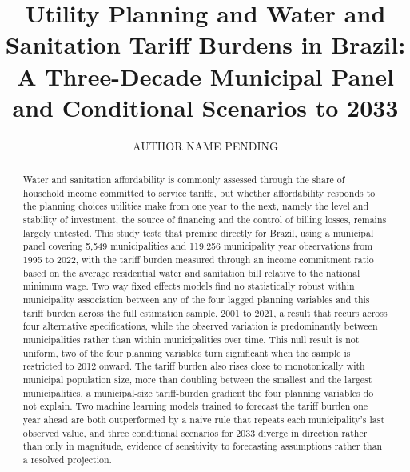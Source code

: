 \documentclass[preprint,12pt]{elsarticle}
\begin{document}
\begin{frontmatter}

\title{Utility Planning and Water and Sanitation Tariff Burdens in Brazil: A Three-Decade Municipal Panel and Conditional Scenarios to 2033}

\author[label1]{AUTHOR NAME PENDING}


\begin{abstract}
Water and sanitation affordability is commonly assessed through the share of household income committed to service tariffs, but whether affordability responds to the planning choices utilities make from one year to the next, namely the level and stability of investment, the source of financing and the control of billing losses, remains largely untested. This study tests that premise directly for Brazil, using a municipal panel covering 5,549 municipalities and 119,256 municipality year observations from 1995 to 2022, with the tariff burden measured through an income commitment ratio based on the average residential water and sanitation bill relative to the national minimum wage. Two way fixed effects models find no statistically robust within municipality association between any of the four lagged planning variables and this tariff burden across the full estimation sample, 2001 to 2021, a result that recurs across four alternative specifications, while the observed variation is predominantly between municipalities rather than within municipalities over time. This null result is not uniform, two of the four planning variables turn significant when the sample is restricted to 2012 onward. The tariff burden also rises close to monotonically with municipal population size, more than doubling between the smallest and the largest municipalities, a municipal-size tariff-burden gradient the four planning variables do not explain. Two machine learning models trained to forecast the tariff burden one year ahead are both outperformed by a naive rule that repeats each municipality's last observed value, and three conditional scenarios for 2033 diverge in direction rather than only in magnitude, evidence of sensitivity to forecasting assumptions rather than a resolved projection.
\end{abstract}


\end{frontmatter}
\end{document}
